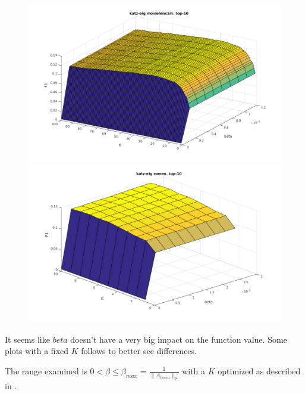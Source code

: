 \begin{figure}[h!]
\centering
\begin{minipage}{.5\textwidth}
    \centering
    \includegraphics[width=\linewidth]{fig/katzeig_beta_k/movielens_katzeig.png}
\end{minipage}%
\begin{minipage}{.5\textwidth}
    \centering
    \includegraphics[width=\linewidth]{fig/katzeig_beta_k/romeo_katzeig.png}
\end{minipage}
\end{figure}


It seems like $beta$ doesn't have a very big impact on the function value. Some plots with a fixed $K$ follows to better see differences.

The range examined is $0 < \beta \leq \beta_{max} = \frac{1}{\|A_{train}\|_2}$ with a $K$ optimized as described in .

